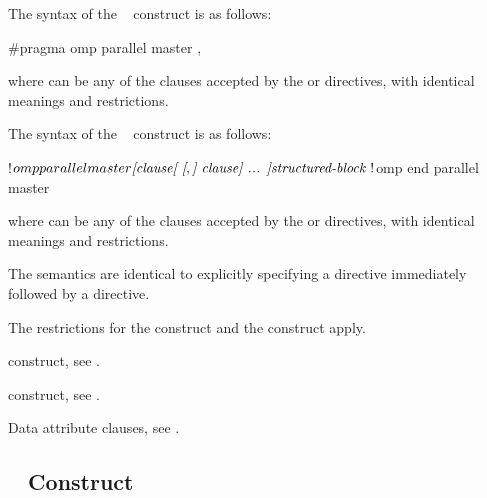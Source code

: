 \syntax
\begin{ccppspecific}
The syntax of the ~ construct is as follows:

\begin{ompcPragma}
#pragma omp parallel master \plc{[clause[ [},\plc{] clause] ... ] new-line}
\end{ompcPragma}

where  can be any of the clauses accepted by the  
or  directives, with identical meanings and restrictions.
\end{ccppspecific}

\begin{fortranspecific}
The syntax of the ~ construct is as follows:

\begin{ompfPragma}
!$omp parallel master \plc{[clause[ [},\plc{] clause] ... ]}
   \plc{structured-block }
!$omp end parallel master
\end{ompfPragma}

where  can be any of the clauses accepted by the  or
 directives, with identical meanings and restrictions.
\end{fortranspecific}

\descr
The semantics are identical to explicitly specifying a  directive
immediately followed by a  directive.

\restrictions
The restrictions for the  construct and the
 construct apply.

\begin{crossrefs}
\item {} construct, see
.

\item {} construct, see
.

\item Data attribute clauses, see
.
\end{crossrefs}



\subsection{~ Construct}
\label{subsec:master taskloop Construct}

